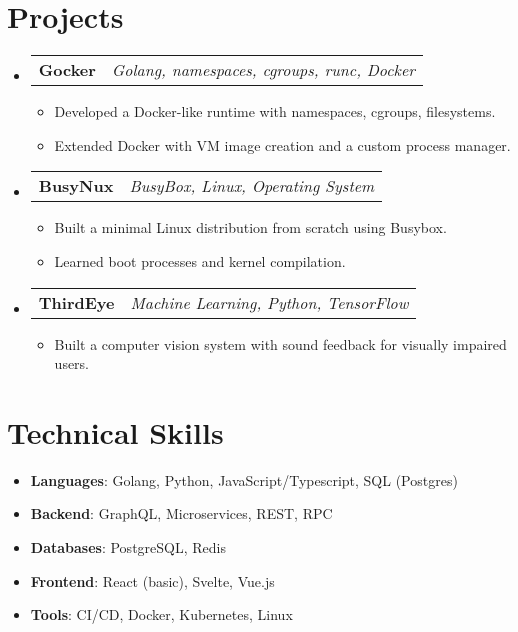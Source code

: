\documentclass[a4paper,11pt]{article}
\makeatletter
\newcommand{\resumeProject}[2]{
  \item
    \begin{tabular*}{0.97\textwidth}{l@{\extracolsep{\fill}}r}
      \textbf{#1} & \emph{#2} \\
    \end{tabular*}\vspace{-5pt}
}
\newcommand{\resumeItem}[1]{\item \small{#1}}
\newcommand{\resumeListStart}{\begin{itemize}[leftmargin=0.15in]}
\newcommand{\resumeListEnd}{\end{itemize}\vspace{-5pt}}
\makeatother
\begin{document}
\section{Projects}
\resumeListStart

  \resumeProject{Gocker}{Golang, namespaces, cgroups, runc, Docker}
  \resumeListStart
    \resumeItem{Developed a Docker-like runtime with namespaces, cgroups, filesystems.}
    \resumeItem{Extended Docker with VM image creation and a custom process manager.}
  \resumeListEnd

  \resumeProject{BusyNux}{BusyBox, Linux, Operating System}
  \resumeListStart
    \resumeItem{Built a minimal Linux distribution from scratch using Busybox.}
    \resumeItem{Learned boot processes and kernel compilation.}
  \resumeListEnd

  \resumeProject{ThirdEye}{Machine Learning, Python, TensorFlow}
  \resumeListStart
    \resumeItem{Built a computer vision system with sound feedback for visually impaired users.}
  \resumeListEnd

\resumeListEnd

\section{Technical Skills}
\resumeListStart
    \resumeItem {\textbf{Languages}{: Golang, Python, JavaScript/Typescript, SQL (Postgres)}} \\
    \resumeItem {\textbf{Backend}{: GraphQL, Microservices, REST, RPC}} \\
    \resumeItem {\textbf{Databases}{: PostgreSQL, Redis} }\\
    \resumeItem {\textbf{Frontend}{: React (basic), Svelte, Vue.js} }\\
    \resumeItem {\textbf{Tools}{: CI/CD, Docker, Kubernetes, Linux}}

\resumeListEnd
\end{document}
